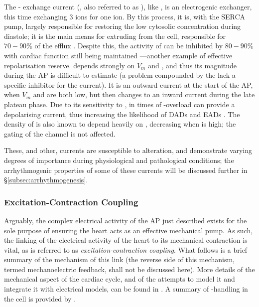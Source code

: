 \documentclass[../thesis-main.tex]{subfiles}
\begin{document}
The \na{}-\ca{} exchange current (\inaca{}, also referred to as \incx{}), like \inak{}, is an electrogenic exchanger, this time exchanging 3 \na{} ions for one \ca{} ion. By this process, it is, with the SERCA pump, largely responsible for restoring the low cytosolic \ca{} concentration during diastole; it is the main means for extruding \ca{} from the cell, responsible for $70-90\%$ of the \ca{} efflux \citep{Eisner2004}. Despite this, the activity of \inaca{} can be inhibited by $80-90\%$ with cardiac function still being maintained \citep{Henderson2004}---another example of effective repolarisation reserve. \inaca{} depends strongly on $V_m$ and \cai{} \citep{Clusin1983}, and thus its magnitude during the AP is difficult to estimate (a problem compounded by the lack a specific inhibitor for the current). It is an outward current at the start of the AP, when $V_m$ and \cai{} are both low, but then changes to an inward current during the late plateau phase. Due to its sensitivity to \cai{}, in times of \ca{}-overload \inaca{} can provide a depolarising current, thus increasing the likelihood of DADs and EADs \citep{Clusin2003}. The density of \ina{} is also known to depend heavily on \cai{}, decreasing when \cai{} is high; the gating of the channel is not affected.

These, and other, currents are susceptible to alteration, and demonstrate varying degrees of importance during physiological and pathological conditions; the arrhythmogenic properties of some of these currents will be discussed further in \S\ref{subsec:arrhythmogenesis}.

\subsubsection{Excitation-Contraction Coupling}
\label{subsubsec:ecc}
Arguably, the complex electrical activity of the AP just described exists for the sole purpose of ensuring the heart acts as an effective mechanical pump. As such, the linking of the electrical activity of the heart to its mechanical contraction is vital, as is referred to as \emph{excitation-contraction coupling}. What follows is a brief summary of the mechanism of this link (the reverse side of this mechanism, termed mechanoelectric feedback, shall not be discussed here). More details of the mechanical aspect of the cardiac cycle, and of the attempts to model it and integrate it with electrical models, can be found in \citet{Trayanova2011}. A summary of \ca{}-handling in the cell is provided by \citet{Eisner2000}.
\end{document}
